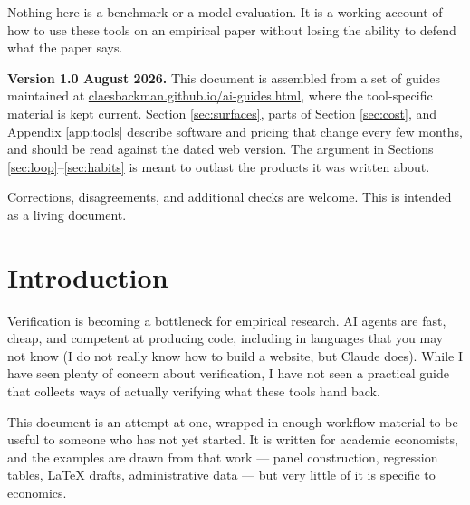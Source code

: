 \documentclass[11pt,a4paper]{article}
\newcommand{\version}{Version 1.0 \textbullet{} August 2026}
\begin{document}
\begin{titlepage}
\begin{minipage}{0.92\textwidth}
Nothing here is a benchmark or a model evaluation. It is a working account of
how to use these tools on an empirical paper without losing the ability to
defend what the paper says.
\end{minipage}

\vfill

\noindent\begin{minipage}{0.92\textwidth}
\footnotesize\color{mutedink}
\textbf{\version.} This document is assembled from a set of guides maintained at
\href{https://claesbackman.github.io/ai-guides.html}{claesbackman.github.io/ai-guides.html},
where the tool-specific material is kept current. Section \ref{sec:surfaces},
parts of Section \ref{sec:cost}, and Appendix \ref{app:tools} describe software
and pricing that change every few months, and should be read against the dated
web version. The argument in Sections \ref{sec:loop}--\ref{sec:habits} is meant
to outlast the products it was written about.

Corrections, disagreements, and additional checks are welcome. This is intended
as a living document.
\end{minipage}

\end{titlepage}

\thispagestyle{empty}
\tableofcontents
\clearpage
{}

\section{Introduction}

Verification is becoming a bottleneck for empirical research. AI agents are
fast, cheap, and competent at producing code, including in languages that you
may not know (I do not really know how to build a website, but Claude does).
While I have seen plenty of concern about verification, I have not seen a
practical guide that collects ways of actually verifying what these tools hand
back.

This document is an attempt at one, wrapped in enough workflow material to be
useful to someone who has not yet started. It is written for academic
economists, and the examples are drawn from that work --- panel construction,
regression tables, LaTeX drafts, administrative data --- but very little of it
is specific to economics.
\end{document}
